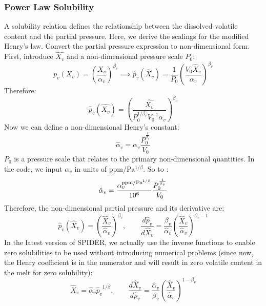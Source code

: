 \subsubsection{Power Law Solubility}
A solubility relation defines the relationship between the dissolved volatile content and the partial pressure.  Here, we derive the scalings for the modified Henry's law.
Convert the partial pressure expression to non-dimensional form.  First, introduce $\hat{X_v}$ and a non-dimensional pressure scale $P_0$:
\begin{equation}
p_v( X_v ) = \left( \frac{X_v}{\alpha_v} \right)^{\beta_v} \implies
 \hat{p}_v( \hat{X}_v ) = \frac{1}{P_0} \left( \frac{V_0 \hat{X}_v}{\alpha_v} \right)^{\beta_v}
 \end{equation}
Therefore:
\begin{equation}
\hat{p}_v ( \hat{X_v} ) = \left( \frac{\hat{X_v}}{P_0^{1/\beta_v} V_0^{-1} \alpha_v} \right)^{\beta_v}
\end{equation}
Now we can define a non-dimensional Henry's constant:
\begin{equation}
\hat{\alpha}_v = \alpha_v \frac{P_0^\frac{1}{\beta_v}}{V_0}
\end{equation}
$P_0$ is a pressure scale that relates to the primary non-dimensional quantities.  In the code, we input $\alpha_v$ in units of ppm/Pa$^{1/\beta}$.  So to :
\begin{equation}
\hat{\alpha}_v = \frac{\alpha_v^{{\rm ppm/Pa}^{1/\beta}}}{10^6} \frac{P_0^\frac{1}{\beta_v}}{V_0}
\label{eq:henryconstnd}
\end{equation}
Therefore, the non-dimensional partial pressure and its derivative are:
\begin{equation}
\hat{p}_v ( \hat{X}_v ) = \left( \frac{\hat{X}_v}{\hat{\alpha}_v} \right) ^ {\beta_v}, \qquad \frac{d \hat{p}_v}{d \hat{X}_v} = \frac{\beta_v}{\hat{\alpha}_v} \left( \frac{\hat{X}_v}{\hat{\alpha}_v} \right)^{\beta_v-1}
\end{equation}
In the latest version of SPIDER, we actually use the inverse functions to enable zero solubilities to be used without introducing numerical problems (since now, the Henry coefficient is in the numerator and will result in zero volatile content in the melt for zero solubility):
\begin{equation}
\hat{X}_v = \hat{\alpha}_v {\hat{p}_v} ^{1/\beta}, \qquad \frac{d \hat{X}_v}{d \hat{p}_v} = \frac{\hat{\alpha}_v}{\beta_v} \left(\frac{\hat{X}_v}{\hat{\alpha}_v}\right)^{1-\beta_v}
\end{equation}
